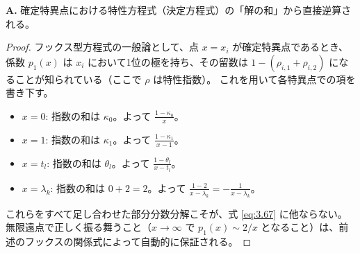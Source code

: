 \begin{Q}
\textbf{A.} 確定特異点における特性方程式（決定方程式）の「解の和」から直接逆算される。

\begin{proof}
フックス型方程式の一般論として、点 $x=x_i$ が確定特異点であるとき、係数 $p_1(x)$ は $x_i$ において1位の極を持ち、その留数は $1 - (\rho_{i,1} + \rho_{i,2})$ になることが知られている（ここで $\rho$ は特性指数）。
これを用いて各特異点での項を書き下す。
\begin{itemize}
    \item $x=0$: 指数の和は $\kappa_0$。よって $\frac{1-\kappa_0}{x}$。
    \item $x=1$: 指数の和は $\kappa_1$。よって $\frac{1-\kappa_1}{x-1}$。
    \item $x=t_l$: 指数の和は $\theta_l$。よって $\frac{1-\theta_l}{x-t_l}$。
    \item $x=\lambda_k$: 指数の和は $0+2=2$。よって $\frac{1-2}{x-\lambda_k} = -\frac{1}{x-\lambda_k}$。
\end{itemize}
これらをすべて足し合わせた部分分数分解こそが、式 \eqref{eq:3.67} に他ならない。無限遠点で正しく振る舞うこと（$x \to \infty$ で $p_1(x) \sim 2/x$ となること）は、前述のフックスの関係式によって自動的に保証される。
\end{proof}
\end{Q}

